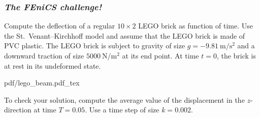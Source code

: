 \begin{frame}
  \frametitle{\emph{The FEniCS challenge!}}

  Compute the deflection of a regular $10 \times 2 $ LEGO brick as
  function of time. Use the St.~Venant--Kirchhoff model and assume
  that the LEGO brick is made of PVC plastic. The LEGO brick is
  subject to gravity of size $g = -9.81~\mathrm{m}/\mathrm{s}^2$ and a
  downward traction of size $5000~\mathrm{N}/\mathrm{m}^2$ at its end
  point. At time $t = 0$, the brick is at rest in its undeformed
  state.

  \begin{center}
    \def\svgwidth{0.6\textwidth}
    {pdf/lego_beam.pdf_tex}
  \end{center}

  To check your solution, compute the average value of the
  displacement in the $z$-direction at time $T = 0.05$. Use a time
  step of size $k = 0.002$.


\end{frame}
